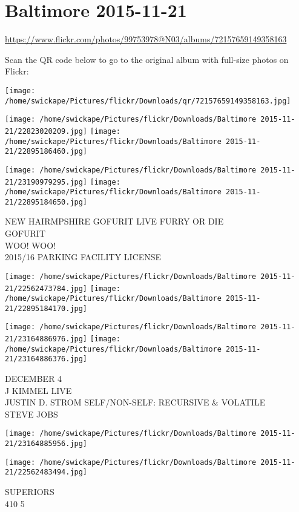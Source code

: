 \documentclass[10pt,letterpaper]{article}
\title{}
\author{}
\date{}
\begin{document}
\section*{Baltimore 2015-11-21}

\url{https://www.flickr.com/photos/99753978@N03/albums/72157659149358163}

Scan the QR code below to go to the original album with full-size photos on Flickr:

\texttt{[image: /home/swickape/Pictures/flickr/Downloads/qr/72157659149358163.jpg]}
\pagebreak

\texttt{[image: /home/swickape/Pictures/flickr/Downloads/Baltimore 2015-11-21/22823020209.jpg]}
\texttt{[image: /home/swickape/Pictures/flickr/Downloads/Baltimore 2015-11-21/22895186460.jpg]}

\texttt{[image: /home/swickape/Pictures/flickr/Downloads/Baltimore 2015-11-21/23190979295.jpg]}
\texttt{[image: /home/swickape/Pictures/flickr/Downloads/Baltimore 2015-11-21/22895184650.jpg]}

NEW HAIRMPSHIRE GOFURIT LIVE FURRY OR DIE\\
GOFURIT\\
WOO!  WOO!\\
2015/16 PARKING FACILITY LICENSE
\pagebreak

\texttt{[image: /home/swickape/Pictures/flickr/Downloads/Baltimore 2015-11-21/22562473784.jpg]}
\texttt{[image: /home/swickape/Pictures/flickr/Downloads/Baltimore 2015-11-21/22895184170.jpg]}

\texttt{[image: /home/swickape/Pictures/flickr/Downloads/Baltimore 2015-11-21/23164886976.jpg]}
\texttt{[image: /home/swickape/Pictures/flickr/Downloads/Baltimore 2015-11-21/23164886376.jpg]}

DECEMBER 4\\
J KIMMEL LIVE\\
JUSTIN D. STROM SELF/NON{-}SELF: RECURSIVE \& VOLATILE\\
STEVE JOBS
\pagebreak

\texttt{[image: /home/swickape/Pictures/flickr/Downloads/Baltimore 2015-11-21/23164885956.jpg]}

\vspace{0.25in}
\texttt{[image: /home/swickape/Pictures/flickr/Downloads/Baltimore 2015-11-21/22562483494.jpg]}

SUPERIORS\\
410 5
\pagebreak
\end{document}

